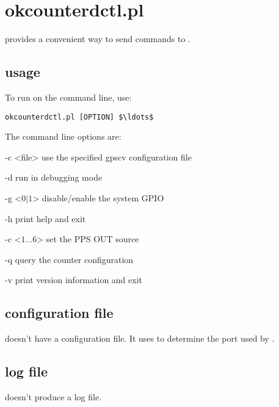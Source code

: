 \section{okcounterdctl.pl \label{s:okcounterdctl}}

 provides a convenient way to send commands to .

\subsection{usage}

To run  on the command line, use:
\begin{lstlisting}[mathescape=true]
okcounterdctl.pl [OPTION] $\ldots$
\end{lstlisting}
The command line options are:
\begin{description*}
	\item[-c \textless file\textgreater] use the specified gpscv configuration file
	\item[-d]	run in debugging mode
	\item[-g \textless $0|1$\textgreater] disable/enable the system GPIO
	\item[-h]	print help and exit
	\item[-c \textless $1\ldots6$\textgreater] set the PPS OUT source
	\item[-q] query the counter configuration
	\item[-v]	print version information and exit
\end{description*}

\subsection{configuration file}

 doesn't have a configuration file. It uses
 to determine the port used by .

\subsection{log file}

 doesn't produce a log file.
